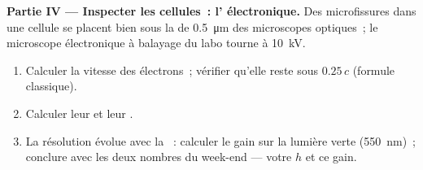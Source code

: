 \begin{problem}
\medskip
\noindent\textbf{Partie IV --- Inspecter les cellules~:
l' électronique.}
Des microfissures dans une cellule se placent bien sous la  de
\qty{0.5}{\micro m} des microscopes optiques~; le microscope
électronique à balayage du labo tourne à \qty{10}{kV}.
\begin{enumerate}[resume]
  \item Calculer la vitesse des électrons~; vérifier qu'elle reste
        sous $0.25\,c$ (formule classique).
  \item Calculer leur  et leur
        .
  \item La résolution évolue avec la
        ~: calculer le gain sur
        la lumière verte (\qty{550}{nm})~; conclure avec les deux
        nombres du week-end --- votre $h$ et ce gain.
\end{enumerate}
\end{problem}
